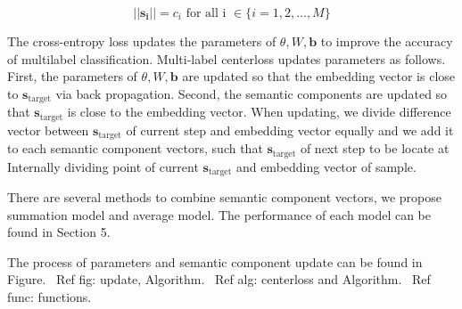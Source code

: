 \[
||\mathbf{s_i}|| = c_i \text{ for all i }\in \{i = 1,2, ..., M\}
\]

The cross-entropy loss updates the parameters of $ \theta, W, \mathbf{b} $ to improve the accuracy of multilabel classification. Multi-label centerloss updates parameters as follows. First, the parameters of $\theta, W, \mathbf{b} $ are updated so that the embedding vector is close to $\mathbf{s}_{\text{target}} $ via back propagation. Second, the semantic components are updated so that $ \mathbf{s}_{\text{target}} $ is close to the embedding vector. When updating, we divide difference vector between $\mathbf{s}_{\text{target}}$ of current step and embedding vector equally and we add it to each semantic component vectors, such that $\mathbf{s}_{\text{target}}$ of next step to be locate at Internally dividing point of current $\mathbf{s}_{\text{target}}$ and embedding vector of sample. 

There are several methods to combine semantic component vectors, we propose summation model and average model. The performance of each model can be found in Section 5.

The process of parameters and semantic component update can be found in Figure. \ Ref {fig: update}, Algorithm. \ Ref {alg: centerloss} and Algorithm. \ Ref {func: functions}.


